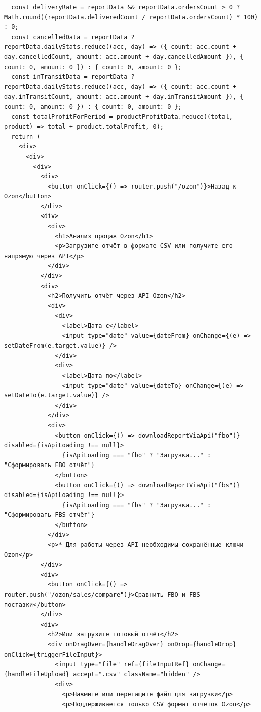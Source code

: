 \begin{code}
\begin{verbatim}
  const deliveryRate = reportData && reportData.ordersCount > 0 ? Math.round((reportData.deliveredCount / reportData.ordersCount) * 100) : 0;
  const cancelledData = reportData ? reportData.dailyStats.reduce((acc, day) => ({ count: acc.count + day.cancelledCount, amount: acc.amount + day.cancelledAmount }), { count: 0, amount: 0 }) : { count: 0, amount: 0 };
  const inTransitData = reportData ? reportData.dailyStats.reduce((acc, day) => ({ count: acc.count + day.inTransitCount, amount: acc.amount + day.inTransitAmount }), { count: 0, amount: 0 }) : { count: 0, amount: 0 };
  const totalProfitForPeriod = productProfitData.reduce((total, product) => total + product.totalProfit, 0);
  return (
    <div>
      <div>
        <div>
          <div>
            <button onClick={() => router.push("/ozon")}>Назад к Ozon</button>
          </div>
          <div>
            <div>
              <h1>Анализ продаж Ozon</h1>
              <p>Загрузите отчёт в формате CSV или получите его напрямую через API</p>
            </div>
          </div>
          <div>
            <h2>Получить отчёт через API Ozon</h2>
            <div>
              <div>
                <label>Дата с</label>
                <input type="date" value={dateFrom} onChange={(e) => setDateFrom(e.target.value)} />
              </div>
              <div>
                <label>Дата по</label>
                <input type="date" value={dateTo} onChange={(e) => setDateTo(e.target.value)} />
              </div>
            </div>
            <div>
              <button onClick={() => downloadReportViaApi("fbo")} disabled={isApiLoading !== null}>
                {isApiLoading === "fbo" ? "Загрузка..." : "Сформировать FBO отчёт"}
              </button>
              <button onClick={() => downloadReportViaApi("fbs")} disabled={isApiLoading !== null}>
                {isApiLoading === "fbs" ? "Загрузка..." : "Сформировать FBS отчёт"}
              </button>
            </div>
            <p>* Для работы через API необходимы сохранённые ключи Ozon</p>
          </div>
          <div>
            <button onClick={() => router.push("/ozon/sales/compare")}>Сравнить FBO и FBS поставки</button>
          </div>
          <div>
            <h2>Или загрузите готовый отчёт</h2>
            <div onDragOver={handleDragOver} onDrop={handleDrop} onClick={triggerFileInput}>
              <input type="file" ref={fileInputRef} onChange={handleFileUpload} accept=".csv" className="hidden" />
              <div>
                <p>Нажмите или перетащите файл для загрузки</p>
                <p>Поддерживается только CSV формат отчётов Ozon</p>

\end{verbatim}
\end{code}
